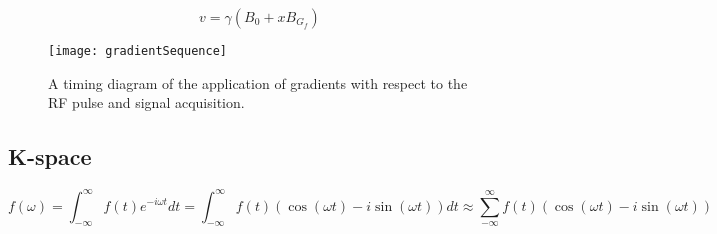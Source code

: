 
\begin{displaymath}
  v = \gamma (B_0 + x B_{G_f})
\end{displaymath}




\begin{figure}
  \centering
  \texttt{[image: gradientSequence]}
  \caption{A timing diagram of the application of gradients with
    respect to the RF pulse and signal acquisition.}
  \label{fig:gradientSequence}
\end{figure}



\subsection{K-space}




\begin{displaymath}
  f(\omega) = \int^\infty_{-\infty}f(t)e^{-i \omega t} dt = \int^\infty_{-\infty}f(t)(\cos(\omega t) - i \sin(\omega t)) dt \approx \sum^\infty_{-\infty}f(t)(\cos(\omega t) - i \sin(\omega t))
\end{displaymath}


